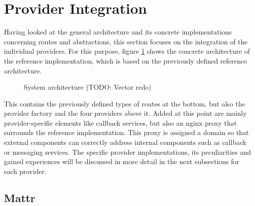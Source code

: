         
    \section{Provider Integration}
    
    Having looked at the general architecture and its concrete implementations concerning routes and abstractions, this section focuses on the integration of the individual providers. For this purpose, figure \ref{figure: sys architecture} shows the concrete architecture of the reference implementation, which is based on the previously defined reference architecture. 
    
    \begin{figure}[ht]
        \centering
        \caption{System architecture (TODO: Vector redo)}
        \label{figure: sys architecture}
    \end{figure}
    
    This contains the previously defined types of routes at the bottom, but also the provider factory and the four providers above it. Added at this point are mainly provider-specific elements like callback services, but also an nginx proxy that surrounds the reference implementation. This proxy is assigned a domain so that external components can correctly address internal components such as callback or messaging services. The specific provider implementations, its peculiarities and gained experiences will be discussed in more detail in the next subsections for each provider.
    
        \subsection{Mattr}
        
